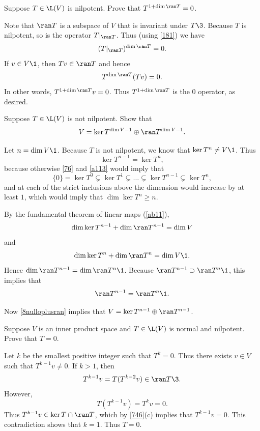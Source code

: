 \exercise
Suppose $T \in \L(V)$ is nilpotent. Prove that $T^{1 + \dim \ran T} = 0$.\label{nilrange}

\begin{Solution}
Note that $\ran T$ is a subspace of $V$ that is invariant under $T\3$. Because $T$ is nilpotent, so is the operator $T|_{\ran T}$. Thus (using \ref{181}) we have
\[
(T|_{\ran T})^{\dim \ran T} = 0.
\]
If $v \in V\1$, then $Tv \in \ran T$ and hence
\[
T^{\dim \ran T}(Tv) = 0.
\]
In other words, $T^{1 + \dim \ran T}v = 0$. Thus $T^{1 + \dim \ran T}$ is the $0$ operator, as desired.
\end{Solution}

\exercise
Suppose $T\in \L(V)$ is not nilpotent. Show that\label{8notnil}
\[
V = \ker T^{\dim V-1} \oplus \ran T^{\dim V-1}.
\]
\exercisedisplayend
{}

\begin{Solution}
Let $n = \dim V\1$. Because $T$ is not nilpotent, we know that $\ker T^n \ne V\1$.  Thus
\[
\ker T^{n-1} = \ker T^n,
\]
because otherwise \ref{76} and \ref{a113} would imply that
\[
\{0\} = \ker T^0 \subsetneq \ker T^1 \subsetneq \dots
\subsetneq \ker T^{n-1} \subsetneq \ker T^n,
\]
and at each of the strict inclusions above the dimension would increase by at least $1$, which would imply that $\dim \ker T^n \ge n$.

By the fundamental theorem of linear maps (\ref{ab11}),
\[
\dim \ker T^{n-1} + \dim \ran T^{n-1} = \dim V
\]
and
\[
\dim \ker T^n + \dim \ran T^n = \dim V\1.
\]
Hence $\dim \ran T^{n-1} = \dim \ran T^n\1$. Because $\ran T^{n-1} \supset \ran T^n\1$, this implies that
\[
\ran T^{n-1} = \ran T^n\1.
\]

Now \ref{8nulloplusran} implies that $V = \ker T^{n-1} \oplus \ran T^{n-1}$.
\end{Solution}

\exercise
Suppose $V$ is an inner product space and $T \in \L(V)$ is normal and nilpotent. Prove that $T = 0$.

\begin{Solution}
Let $k$ be the smallest positive integer such that $T^k = 0$. Thus there exists $v \in V$ such that $T^{k-1} v \ne 0$. If $k > 1$, then
\[
T^{k-1}v = T(T^{k-2}v) \in \ran T\3.
\]
However,
\[
T(T^{k-1}v) = T^k v = 0.
\]
Thus $T^{k-1} v \in \ker T \cap \ran T$, which by \ref{746}(c) implies that $T^{k-1}v = 0$. This contradiction shows that $k=1$. Thus $T=0$.
\end{Solution}

